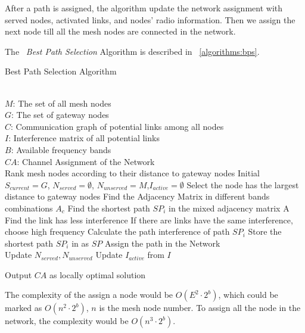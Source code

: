 After a path is assigned, the algorithm update the network assignment with served nodes, activated links, and nodes' radio information. Then we assign the next node till all the mesh nodes are connected in the network.

The ~\emph{Best Path Selection} Algorithm is described in ~\ref{algorithms:bps}.

\begin{algorithm}
    \small
\caption{Best Path Selection Algorithm}
\label{algorithms:bps}
\begin{algorithmic}[1]
\REQUIRE  ~~\\
	$M$: The set of all mesh nodes\\
	$G$: The set of gateway nodes\\
	$C$: Communication graph of potential links among all nodes\\
	$I$: Interference matrix of all potential links \\
	$B$: Available frequency bands
\ENSURE ~~\\    
$CA$: Channel Assignment of the Network\\
\STATE Rank mesh nodes according to their distance to gateway nodes
\STATE Initial $S_{current}=G$, $N_{served}=\emptyset$, $N_{unserved}=M$,$I_{active}=\emptyset$
\STATE Select the node has the largest distance to gateway nodes
\STATE Find the Adjacency Matrix in different bands combinations $A_c$
\STATE Find the shortest path $SP_i$ in the mixed adjacency matrix A 
\STATE Find the link has less interference
\STATE If there are links have the same interference, choose high frequency
\STATE Calculate the path interference of path $SP_i$
\ENDFOR
\STATE Store the shortest path $SP_i$ in as $SP$
\ENDFOR
\STATE Assign the path in the Network\\
		\STATE Update $N_{served},N_{unserved}$
		\STATE Update $I_{active}$ from $I$
\ENDWHILE 

Output $CA$ as locally optimal solution\\
\end{algorithmic}
\end{algorithm}

The complexity of the assign a node would be $O(E^2\cdot2^b)$, which could be marked as $O(n^2\cdot2^b)$, $n$ is the mesh node number.
 To assign all the node in the network, the complexity would be $O(n^3\cdot2^b)$.


